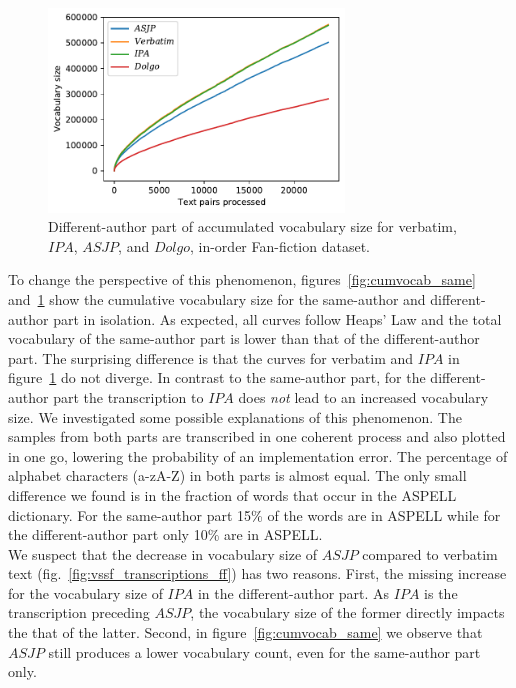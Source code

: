 \begin{figure}
  \centering
  \includegraphics[width=0.7\textwidth]{figures/cum_vocab_size_ff_inorder_onlydiff_ipa}
  \caption{Different-author part of accumulated vocabulary size for verbatim, $IPA$, $ASJP$, and $Dolgo$, in-order Fan-fiction dataset.}
  \label{fig:cumvocab_diff}
\end{figure}
To change the perspective of this phenomenon, figures~\ref{fig:cumvocab_same} and~\ref{fig:cumvocab_diff} show the cumulative vocabulary size for the same-author and different-author part in isolation.
As expected, all curves follow Heaps' Law and the total vocabulary of the same-author part is lower than that of the different-author part.
The surprising difference is that the curves for verbatim and $IPA$ in figure~\ref{fig:cumvocab_diff} do not diverge.
In contrast to the same-author part, for the different-author part the transcription to $IPA$ does \textit{not} lead to an increased vocabulary size.
We investigated some possible explanations of this phenomenon.
The samples from both parts are transcribed in one coherent process and also plotted in one go, lowering the probability of an implementation error.
The percentage of alphabet characters (a-zA-Z) in both parts is almost equal.
The only small difference we found is in the fraction of words that occur in the ASPELL dictionary.
For the same-author part 15\% of the words are in ASPELL while for the different-author part only 10\% are in ASPELL\@.\\
We suspect that the decrease in vocabulary size of $ASJP$ compared to verbatim text (fig.~\ref{fig:vssf_transcriptions_ff}) has two reasons.
First, the missing increase for the vocabulary size of $IPA$ in the different-author part.
As $IPA$ is the transcription preceding $ASJP$, the vocabulary size of the former directly impacts the that of the latter.
Second, in figure~\ref{fig:cumvocab_same} we observe that $ASJP$ still produces a lower vocabulary count, even for the same-author part only.

